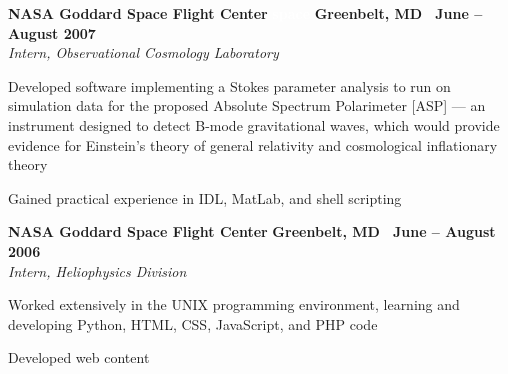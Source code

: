 \documentclass[10pt]{article}
\newcommand{\leftandright}[2]{\noindent\textbf{#1}\hfill
\textbf{#2}}
\begin{document}
\leftandright{NASA Goddard Space Flight Center }{ }
\leftandright{\textcolor{white}{space} }{Greenbelt, MD \textbullet\, June -- August 2007}\\  
\vspace{-0.8em}
\textit{Intern, Observational Cosmology Laboratory} 
\begin{itemize*}
  \item Developed software implementing a Stokes parameter analysis to
    run on simulation data for the proposed Absolute Spectrum
    Polarimeter [ASP] — an instrument designed to detect B-mode
    gravitational waves, which would provide evidence for Einstein’s
    theory of general relativity and cosmological inflationary theory
  \item Gained practical experience in IDL, MatLab, and shell scripting
\end{itemize*}


\leftandright{NASA Goddard Space Flight Center}{Greenbelt, MD \textbullet\, June -- August 2006}\\  
\vspace{-0.8em}
\textit{Intern,  Heliophysics Division}
\begin{itemize*}
  \item Worked extensively in the UNIX programming environment, learning and
    developing Python, HTML, CSS, JavaScript, and PHP code
  \item Developed web content  %
\end{itemize*}
\end{document}
